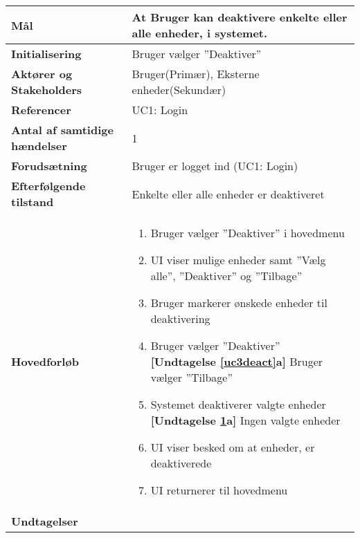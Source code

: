 \begin{table}[H] \centering
	\label{tab:UC3}
\begin{tabular}{|p{6cm}|p{8cm}|}
	\hline
		\textbf{Mål}						&At Bruger kan deaktivere enkelte eller alle enheder, i systemet. \\\hline
		\textbf{Initialisering} 			&Bruger vælger ''Deaktiver'' \\ \hline
		\textbf{Aktører og Stakeholders}	&Bruger(Primær), Eksterne enheder(Sekundær)\\ \hline
		\textbf{Referencer} 				&UC1: Login \\ \hline
		\textbf{Antal af samtidige hændelser} &1 \\ \hline
		\textbf{Forudsætning} 			&Bruger er logget ind (UC1: Login)\\ \hline
		\textbf{Efterfølgende tilstand} 	&Enkelte eller alle enheder er deaktiveret \\ \hline
		\textbf{Hovedforløb}				&

	\begin{enumerate}	
						
					
				\item Bruger vælger ''Deaktiver'' i hovedmenu
										
				\item \label{uc3menu}UI viser mulige enheder samt ''Vælg alle'', ''Deaktiver''  og ''Tilbage''
												
				\item Bruger markerer ønskede enheder til deaktivering
												
				\item \label{uc3deact} Bruger vælger ''Deaktiver''\newline
					\textbf{[Undtagelse \ref{uc3deact}a]} Bruger vælger ''Tilbage''
												
				\item \label{uc3sysdeact} Systemet deaktiverer valgte enheder \newline
					\textbf{[Undtagelse \ref{uc3sysdeact}a]} Ingen valgte enheder
				
				\item UI viser besked om at enheder, er deaktiverede
																	
				\item UI returnerer til hovedmenu	
	
	\end{enumerate} \\ \hline

		\textbf{Undtagelser}	
		

\end{tabular}
\end{table}
